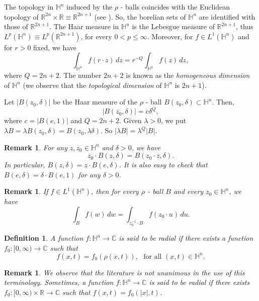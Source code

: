 \documentclass[oneside,10pt]{article}
\newtheorem{definition}[theorem]{Definition}
\newtheorem{remark}[theorem]{Remark}
\begin{document}
The topology in $\mathbb{H}^{n}$ induced by the $\rho$ - balls coincides with the Euclidean topology of 
$\mathbb{R}^{2n} \times \mathbb{R} \equiv\mathbb{R}^{2n+1}$ (see \cite[Proposition 3.1.37]{Fischer}). So, the borelian sets of 
$\mathbb{H}^{n}$ are identified with those of $\mathbb{R}^{2n+1}$. The Haar measure in $\mathbb{H}^{n}$ is the Lebesgue measure of 
$\mathbb{R}^{2n+1}$, thus $L^{p}(\mathbb{H}^{n}) \equiv L^{p}(\mathbb{R}^{2n+1})$, for every $0 < p \leq \infty$. Moreover, for 
$f \in L^{1}(\mathbb{H}^{n})$ and for $r > 0$ fixed, we have
\begin{equation} \label{homog dim}
\int_{\mathbb{H}^{n}} f(r \cdot z) \, dz = r^{-Q} \int_{\mathbb{H}^{n}} f(z) \, dz,
\end{equation}
where $Q= 2n+2$. The number $2n+2$ is known as the {\it homogeneous dimension} of $\mathbb{H}^{n}$ (we observe that the {\it topological dimension} of $\mathbb{H}^{n}$ is $2n+1$).


Let $|B(z_0, \delta)|$ be the Haar measure of the $\rho$ - ball $B(z_0, \delta) \subset \mathbb{H}^{n}$. Then, 
\[
|B(z_0, \delta)| = c \delta^{Q},
\]
where $c = |B(e,1)|$ and  $Q = 2n+2$. Given $\lambda > 0$, we put $\lambda B = \lambda B(z_0, \delta) = 
B(z_0, \lambda \delta)$. So $|\lambda B| = \lambda^{Q}	|B|$.

\begin{remark}
For any $z, z_0 \in \mathbb{H}^{n}$ and $\delta >0$, we have
\[
z_0 \cdot B(z, \delta) = B(z_0 \cdot z, \delta).
\]
In particular, $B(z, \delta) = z \cdot B(e, \delta)$. It is also easy to check that $B(e, \delta) = \delta \cdot B(e,1)$ for any $\delta > 0$.
\end{remark}
\begin{remark} \label{cambio de centro}
If $f \in L^{1}(\mathbb{H}^{n})$, then for every $\rho$ - ball $B$ and every $z_0 \in \mathbb{H}^{n}$, we have
\[
\int_{B} f(w) \, dw = \int_{z_{0}^{-1} \cdot B} f(z_0 \cdot u) \, du.
\]
\end{remark}

\begin{definition} \label{radial}
A function $f : \mathbb{H}^n \to \mathbb{C}$ is said to be radial if there exists a function $f_0 : [0, \infty) \to \mathbb{C}$ such that
\[
f(x,t) = f_0(\rho(x,t)), \,\,\,\, \text{for all} \,\, (x,t) \in \mathbb{H}^n. 
\]
\end{definition}

\begin{remark}
We observe that the literature is not unanimous in the use of this terminology. Sometimes, a function $f : \mathbb{H}^n \to \mathbb{C}$ is said to be radial if there exists $f_0 : [0, \infty) \times \mathbb{R} \to \mathbb{C}$ such that $f(x,t) = f_0 (|x|, t)$.
\end{remark}
\end{document}
